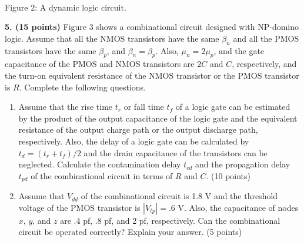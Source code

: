 \documentclass[10pt]{article}
\newcommand{\mos}[4]{\begin{scope}[shift={(#1,#2)}]
\draw (0,.24)--(0,-.24);\draw (0,.20)--(.25,.20)--(.25,.5);
\draw (0,-.20)--(.25,-.20)--(.25,-.5);\draw (-.16,.23)--(-.16,-.23);
\ifnum#4=1\draw (-.26,0) circle (.06);\draw (-.75,0)--(-.32,0);\else\draw (-.75,0)--(-.16,0);\fi
\node[anchor=east,font=\scriptsize] at (-.76,0) {$#3$};\end{scope}}
\newcommand{\ground}[2]{\draw (#1,#2)--(#1,{#2-.12});\draw ({#1-.17},{#2-.12})--({#1+.17},{#2-.12});\draw ({#1-.11},{#2-.20})--({#1+.11},{#2-.20});}
\newcommand{\rail}[3]{\draw (#1,#2)--(#1,{#2+.14});\node[above,font=\scriptsize] at (#1,{#2+.14}) {$#3$};}
\begin{document}
\begin{center}\\Figure 2: A dynamic logic circuit.\end{center}
\textbf{5. (15 points)} Figure 3 shows a combinational circuit designed with NP-domino logic. Assume that all the NMOS transistors have the same $\beta_n$ and all the PMOS transistors have the same $\beta_p$, and $\beta_n=\beta_p$. Also, $\mu_n=2\mu_p$, and the gate capacitance of the PMOS and NMOS transistors are $2C$ and $C$, respectively, and the turn-on equivalent resistance of the NMOS transistor or the PMOS transistor is $R$. Complete the following questions.
\begin{enumerate}[label=(\alph*),leftmargin=7mm]
\item Assume that the rise time $t_r$ or fall time $t_f$ of a logic gate can be estimated by the product of the output capacitance of the logic gate and the equivalent resistance of the output charge path or the output discharge path, respectively. Also, the delay of a logic gate can be calculated by $t_d=(t_r+t_f)/2$ and the drain capacitance of the transistors can be neglected. Calculate the contamination delay $t_{cd}$ and the propagation delay $t_{pd}$ of the combinational circuit in terms of $R$ and $C$. (10 points)
\item Assume that $V_{dd}$ of the combinational circuit is 1.8 V and the threshold voltage of the PMOS transistor is $|V_{tp}|=.6$ V. Also, the capacitance of nodes $x$, $y$, and $z$ are .4 pf, .8 pf, and 2 pf, respectively. Can the combinational circuit be operated correctly? Explain your answer. (5 points)
\end{enumerate}
\end{document}
